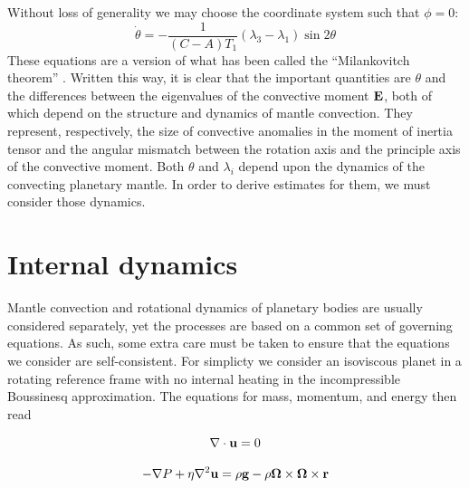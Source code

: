 \documentclass[extra,mreferee]{gji}
\begin{document}
Without loss of generality we may choose the coordinate system such that $\phi=0$:
\begin{equation}
\dot{\theta} = - \frac{1}{(C-A)T_1} (\lambda_3-\lambda_1) \sin{2 \theta}
\label{eq:simple_milankovitch}
\end{equation}
These equations are a version of what has been called the ``Milankovitch theorem'' \citep{munk1960rotation}.  
Written this way, it is clear that the important quantities are $\theta$ and the differences between the eigenvalues of the convective moment $\bf E$, both of which depend on the structure and dynamics of mantle convection.  
They represent, respectively, the size of convective anomalies in the moment of inertia tensor and the angular mismatch between the rotation axis and the principle axis of the convective moment.
Both $\theta$ and $\lambda_i$ depend upon the dynamics of the convecting planetary mantle.
In order to derive estimates for them, we must consider those dynamics.

\section{Internal dynamics}
\label{sec:internal}

Mantle convection and rotational dynamics of planetary bodies are usually considered separately, yet the processes are based on a common set of governing equations. 
As such, some extra care must be taken to ensure that the equations we consider are self-consistent. 
For simplicty we consider an isoviscous planet in a rotating reference frame with no internal heating in the incompressible Boussinesq approximation.  The equations for mass, momentum, and energy then read

\begin{equation}
\nabla \cdot {\bf u} = 0
\label{eq:conserve_mass}
\end{equation}

\begin{equation}
\begin{aligned}
- \nabla P + \eta \nabla^2 {\bf u} =  \rho {\bf g} -  \rho{\bf \Omega \times \Omega \times r}
\label{eq:navier_stokes}
\end{aligned}
\end{equation}
\end{document}
